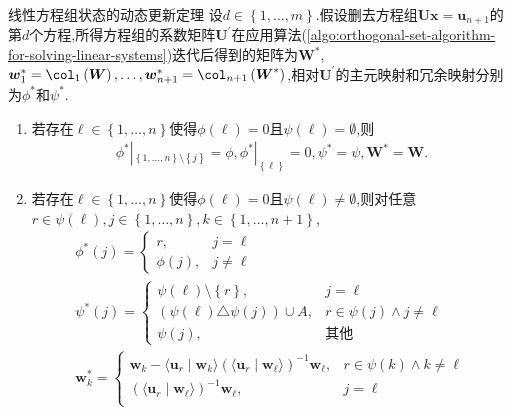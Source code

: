\begin{theorem}{线性方程组状态的动态更新定理}{}
	设$d\in\left\{1,\ldots,m\right\}$.假设删去方程组$\boldsymbol{U}\boldsymbol{x}=\boldsymbol{u}_{n+1}$的第$d$个方程,所得方程组的系数矩阵$\boldsymbol{U}^{\prime}$在应用算法(\ref{algo:orthogonal-set-algorithm-for-solving-linear-systems})迭代后得到的矩阵为$\boldsymbol{W}^{\ast}$,$\boldsymbol{w}_{1}^{\ast}=\col_{1}\left(\boldsymbol{W}\right),\ldots,\boldsymbol{w}_{n+1}^{\ast}=\col_{n+1}\left(\boldsymbol{W}^{\ast}\right)$,相对$\boldsymbol{U}^{\prime}$的主元映射和冗余映射分别为$\phi^{\ast}$和$\psi^{\ast}$.
	\begin{enumerate}
		\item 若存在$\ell\in\left\{1,\ldots,n\right\}$使得$\phi\left(\ell\right)=0$且$\psi\left(\ell\right)=\emptyset$,则
		\begin{align*}
			\phi^{\ast}|_{\left\{1,\ldots,n\right\}\setminus\left\{j\right\}}=\phi,\phi^{\ast}|_{\left\{\ell\right\}}=0,\psi^{\ast}=\psi,\boldsymbol{W}^{\ast}=\boldsymbol{W}.
		\end{align*}
		\item 若存在$\ell\in\left\{1,\ldots,n\right\}$使得$\phi\left(\ell\right)=0$且$\psi\left(\ell\right)\neq\emptyset$,则对任意$r\in\psi\left(\ell\right),j\in\left\{1,\ldots,n\right\},k\in\left\{1,\ldots,n+1\right\}$,
		\begin{gather*}
			\phi^{\ast}\left(j\right)=
			\begin{cases}
				r,&j=\ell\\
				\phi\left(j\right),&j\neq\ell
			\end{cases}\\
			\psi^{\ast}\left(j\right)=
			\begin{cases}
				\psi\left(\ell\right)\setminus\left\{r\right\},&j=\ell\\
				\left(\psi\left(\ell\right)\triangle\psi\left(j\right)\right)\cup A,&r\in\psi\left(j\right)\wedge j\neq\ell\\
				\psi\left(j\right),&\text{其他}
			\end{cases}\\
			\boldsymbol{w}_{k}^{\ast}=
			\begin{cases}
				\boldsymbol{w}_{k}-\langle\boldsymbol{u}_{r}\mid\boldsymbol{w}_{k}\rangle\left(\langle\boldsymbol{u}_{r}\mid\boldsymbol{w}_{\ell}\rangle\right)^{-1}\boldsymbol{w}_{\ell},&r\in\psi\left(k\right)\wedge k\neq\ell\\
				\left(\langle\boldsymbol{u}_{r}\mid\boldsymbol{w}_{\ell}\rangle\right)^{-1}\boldsymbol{w}_{\ell},&j=\ell\\

\end{cases}
\end{gather*}
\end{enumerate}
\end{theorem}
